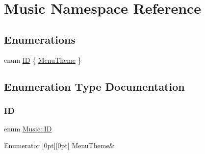 \hypertarget{namespace_music}{}\section{Music Namespace Reference}
\label{namespace_music}
\subsection*{Enumerations}
\begin{DoxyCompactItemize}
\item 
enum \hyperlink{namespace_music_ad5e0c8c2e2e7bdcbffbb125051531b86}{ID} \{ \hyperlink{namespace_music_ad5e0c8c2e2e7bdcbffbb125051531b86a6bcadfc9c1f05aec18efb26a7bec3bc0}{Menu\+Theme}
 \}
\end{DoxyCompactItemize}


\subsection{Enumeration Type Documentation}
\hypertarget{namespace_music_ad5e0c8c2e2e7bdcbffbb125051531b86}{}\label{namespace_music_ad5e0c8c2e2e7bdcbffbb125051531b86} 
\subsubsection{\texorpdfstring{ID}{ID}}
{\footnotesize\ttfamily enum \hyperlink{namespace_music_ad5e0c8c2e2e7bdcbffbb125051531b86}{Music\+::\+ID}}

\begin{DoxyEnumFields}{Enumerator}
[0pt][0pt]{}\hypertarget{namespace_music_ad5e0c8c2e2e7bdcbffbb125051531b86a6bcadfc9c1f05aec18efb26a7bec3bc0}{}\label{namespace_music_ad5e0c8c2e2e7bdcbffbb125051531b86a6bcadfc9c1f05aec18efb26a7bec3bc0} 
Menu\+Theme&\\
\hline

\end{DoxyEnumFields}
